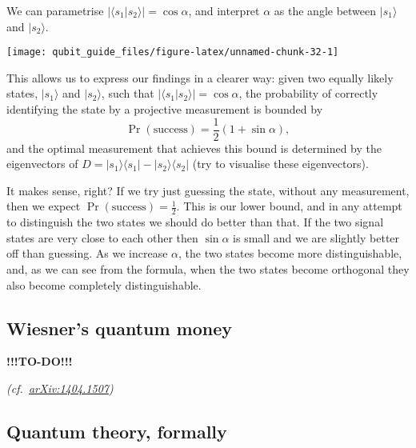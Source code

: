 \documentclass[fleqn]{article}
\begin{document}
We can parametrise \(|\langle s_1|s_2\rangle| = \cos\alpha\), and interpret \(\alpha\) as the angle between \(|s_1\rangle\) and \(|s_2\rangle\).

\begin{center}\texttt{[image: qubit\_guide\_files/figure-latex/unnamed-chunk-32-1]} \end{center}

This allows us to express our findings in a clearer way: given two equally likely states, \(|s_1\rangle\) and \(|s_2\rangle\), such that \(|\langle s_1|s_2\rangle| = \cos\alpha\), the probability of correctly identifying the state by a projective measurement is bounded by
\[
 \Pr (\text{success})
 = \frac12(1 + \sin\alpha),
\]
and the optimal measurement that achieves this bound is determined by the eigenvectors of \(D = |s_1\rangle\langle s_1|-|s_2\rangle\langle s_2|\) (try to visualise these eigenvectors).

It makes sense, right?
If we try just guessing the state, without any measurement, then we expect \(\Pr (\text{success}) = \frac12\).
This is our lower bound, and in any attempt to distinguish the two states we should do better than that.
If the two signal states are very close to each other then \(\sin\alpha\) is small and we are slightly better off than guessing.
As we increase \(\alpha\), the two states become more distinguishable, and, as we can see from the formula, when the two states become orthogonal they also become completely distinguishable.

\hypertarget{wiesners-quantum-money}{%
\subsection{Wiesner's quantum money}\label{wiesners-quantum-money}}

\textbf{!!!TO-DO!!!}

\emph{(cf.~\href{https://arxiv.org/abs/1404.1507}{arXiv:1404.1507})}

\hypertarget{quantum-theory-formally}{%
\subsection{Quantum theory, formally}\label{quantum-theory-formally}}
\end{document}
